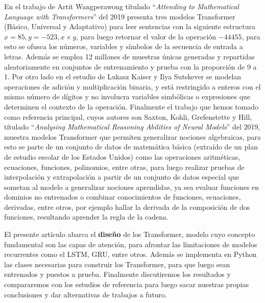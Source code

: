 \documentclass[conference]{IEEEtran}
\begin{document}
En el trabajo \cite{b2} de Artit Wangperawong títulado \enquote{\textit{Attending to Mathematical Language with Transformers}} del 2019 presenta tres modelos Transformer (Básico, Universal y Adaptativo) para leer sentencias con la siguiente estructura $x=85, y = -523, x \times y$, para luego retornar el valor de la operación $-44455$, para esto se ofusca los números, variables y símbolos de la secuencia de entrada a letras. Además se emplea 12 millones de muestras únicas generadas y repartidas aleatoriamente en conjuntos de entrenamiento y prueba con la proporción de 9 a 1. Por otro lado en el estudio de 
Lukasz Kaiser y Ilya Sutskever \cite{b5} se modelan operaciones de adición y multiplicación binaria, y está restringido a enteros con el mismo número de dígitos y no involucra variables simbólicas o expresiones que determinen el contexto de la operación. Finalmente el trabajo que hemos tomado como referencia principal, cuyos autores son Saxton, Kohli, Grefenstette y Hill, títulado \enquote{\textit{Analysing Mathematical Reasoning Abilities of Neural Models}} \cite{b3} del 2019, muestra modelos Transformer que permiten generalizar nociones algebraicas, para esto se parte de un conjunto de datos de matemática básica (extraído de un plan de estudio escolar de los Estados Unidos) como las operaciones aritméticas, ecuaciones, funciones, polinomios, entre otras, para luego realizar pruebas de interpolación y extrapolación a partir de un conjunto de datos especial que sometan al modelo a generalizar nociones aprendidas, ya sea evaluar funciones en dominios no entrenados o combinar conocimientos de funciones, ecuaciones, derivadas, entre otros, por ejemplo hallar la derivada de la composición de dos funciones, resultando aprender la regla de la cadena.

El presente artículo abarca el \textbf{diseño} de los Transformer, modelo cuyo concepto fundamental son las capas de atención, para afrontar las límitaciones de modelos recurrentes como el LSTM, GRU, entre otros. Además se implementa en Python las clases necesarias para construir los Transformer, para que luego sean entrenados y puestos a prueba. Finalmente discutiremos los resultados y compararemos con los estudios de referencia para luego sacar nuestras propias conclusiones y dar alternativas de trabajos a futuro.
\end{document}

